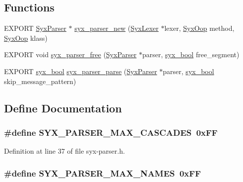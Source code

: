 \subsection*{Functions}
\begin{CompactItemize}
\item 
EXPORT \hyperlink{struct_syx_parser}{SyxParser} $\ast$ \hyperlink{syx-parser_8h_42ba7420dc7ded6be9ca7e1b44823ce0}{syx\_\-parser\_\-new} (\hyperlink{struct_syx_lexer}{SyxLexer} $\ast$lexer, \hyperlink{syx-types_8h_1121caba2d40b2ce090b640762744ccd}{SyxOop} method, \hyperlink{syx-types_8h_1121caba2d40b2ce090b640762744ccd}{SyxOop} klass)
\item 
EXPORT void \hyperlink{syx-parser_8h_776f1944e2f6074005eefdc32a8479ff}{syx\_\-parser\_\-free} (\hyperlink{struct_syx_parser}{SyxParser} $\ast$parser, \hyperlink{syx-types_8h_c6dc09b276b99fa1956364359139daab}{syx\_\-bool} free\_\-segment)
\item 
EXPORT \hyperlink{syx-types_8h_c6dc09b276b99fa1956364359139daab}{syx\_\-bool} \hyperlink{syx-parser_8h_980d776f2ab5aaee6828520cb6df2f13}{syx\_\-parser\_\-parse} (\hyperlink{struct_syx_parser}{SyxParser} $\ast$parser, \hyperlink{syx-types_8h_c6dc09b276b99fa1956364359139daab}{syx\_\-bool} skip\_\-message\_\-pattern)
\end{CompactItemize}


\subsection{Define Documentation}
\hypertarget{syx-parser_8h_b78eeb5d808753903d97c2cf5d316b8a}{
\subsubsection{\setlength{\rightskip}{0pt plus 5cm}\#define SYX\_\-PARSER\_\-MAX\_\-CASCADES~0xFF}}
\label{syx-parser_8h_b78eeb5d808753903d97c2cf5d316b8a}




Definition at line 37 of file syx-parser.h.\hypertarget{syx-parser_8h_1ac781464502bb6fc3de3b46d1c91f95}{
\subsubsection{\setlength{\rightskip}{0pt plus 5cm}\#define SYX\_\-PARSER\_\-MAX\_\-NAMES~0xFF}}
\label{syx-parser_8h_1ac781464502bb6fc3de3b46d1c91f95}




